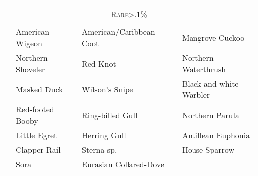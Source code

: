 \documentclass{article}
\begin{document}
\begin{center}
 
\begin{tabularx}{\textwidth}{cXcXcX} 
\hline
\\
\multicolumn{6}{c}{\textsc{ \Large{Rare\footnotesize{>.1\%}}}} \\ 
\\
\hline
\underline{\hspace{3ex}} 	 &American Wigeon 	 &\underline{\hspace{3ex}} 	 &American/Caribbean Coot 	 &\underline{\hspace{3ex}} 	 &Mangrove Cuckoo \\ 
\underline{\hspace{3ex}} 	 &Northern Shoveler 	 &\underline{\hspace{3ex}} 	 &Red Knot 	 &\underline{\hspace{3ex}} 	 &Northern Waterthrush \\ 
\underline{\hspace{3ex}} 	 &Masked Duck 	 &\underline{\hspace{3ex}} 	 &Wilson's Snipe 	 &\underline{\hspace{3ex}} 	 &Black-and-white Warbler \\ 
\underline{\hspace{3ex}} 	 &Red-footed Booby 	 &\underline{\hspace{3ex}} 	 &Ring-billed Gull 	 &\underline{\hspace{3ex}} 	 &Northern Parula \\ 
\underline{\hspace{3ex}} 	 &Little Egret 	 &\underline{\hspace{3ex}} 	 &Herring Gull 	 &\underline{\hspace{3ex}} 	 &Antillean Euphonia \\ 
\underline{\hspace{3ex}} 	 &Clapper Rail 	 &\underline{\hspace{3ex}} 	 &Sterna sp. 	 &\underline{\hspace{3ex}} 	 &House Sparrow \\ 
\underline{\hspace{3ex}} 	 &Sora 	 &\underline{\hspace{3ex}} 	 &Eurasian Collared-Dove 	 &\underline{\hspace{3ex}} 	 &\underline{\hfill} \\ 
\hline
\end{tabularx} 
\end{center}
\end{document}
